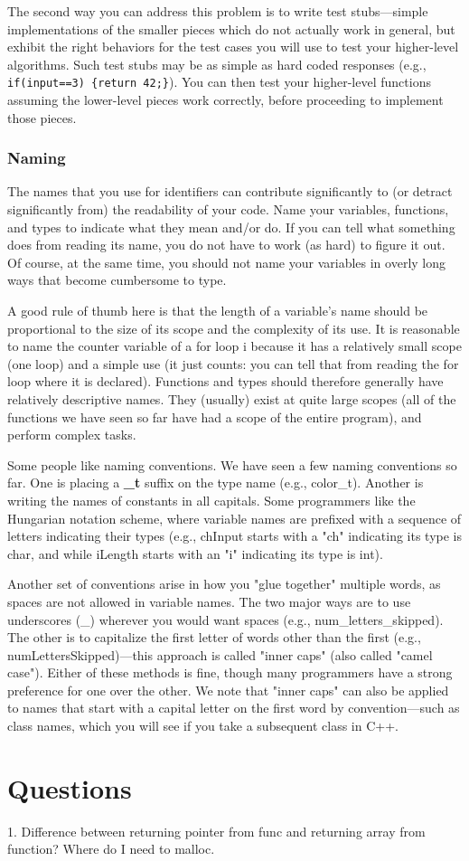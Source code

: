 \documentclass[11pt, a4paper]{article}
\begin{document}
The second way you can address this problem is to write test stubs—simple implementations of the smaller pieces which do not actually work in general, but exhibit the right behaviors for the test cases you will use to test your higher-level algorithms. Such test stubs may be as simple as hard coded responses (e.g., \texttt{if(input==3) \{return 42;\}}). You can then test your higher-level functions assuming the lower-level pieces work correctly, before proceeding to implement those pieces.


\subsubsection{Naming}%
\label{ssub:naming}



The names that you use for identifiers can contribute significantly to (or detract significantly from) the readability of your code. Name your variables, functions, and types to indicate what they mean and/or do. If you can tell what something does from reading its name, you do not have to work (as hard) to figure it out. Of course, at the same time, you should not name your variables in overly long ways that become cumbersome to type.

A good rule of thumb here is that the length of a variable's name should be proportional to the size of its scope and the complexity of its use. It is reasonable to name the counter variable of a for loop i because it has a relatively small scope (one loop) and a simple use (it just counts: you can tell that from reading the for loop where it is declared). Functions and types should therefore generally have relatively descriptive names. They (usually) exist at quite large scopes (all of the functions we have seen so far have had a scope of the entire program), and perform complex tasks.

Some people like naming conventions. We have seen a few naming conventions so far. One is placing a \textbf{\_t} suffix on the type name (e.g., color\_t). Another is writing the names of constants in all capitals. Some programmers like the Hungarian notation scheme, where variable names are prefixed with a sequence of letters indicating their types (e.g., chInput starts with a "ch" indicating its type is char, and while iLength starts with an "i" indicating its type is int).

Another set of conventions arise in how you "glue together" multiple words, as spaces are not allowed in variable names. The two major ways are to use underscores (\_) wherever you would want spaces (e.g., num\_letters\_skipped). The other is to capitalize the first letter of words other than the first (e.g., numLettersSkipped)—this approach is called "inner caps" (also called "camel case"). Either of these methods is fine, though many programmers have a strong preference for one over the other. We note that "inner caps" can also be applied to names that start with a capital letter on the first word by convention—such as class names, which you will see if you take a subsequent class in C++.





\section{Questions}%
\label{sec:questions}

1. Difference between returning pointer from func and returning array from function? Where do I need to malloc.
\end{document}
